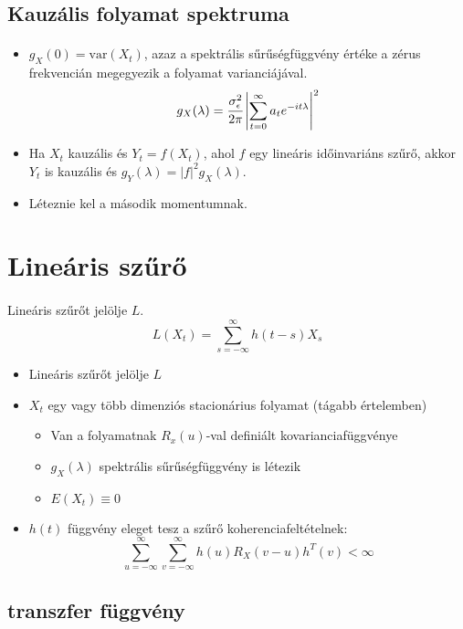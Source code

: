 \documentclass[11pt,a4paper]{article}
\begin{document}
				\subsection{Kauzális folyamat spektruma}
					\paragraph{}
					\begin{itemize}
						\item $g_X(0) = \text{var}(X_t)$, azaz a spektrális sűrűségfüggvény értéke a zérus frekvencián megegyezik a folyamat varianciájával. $$g_X(\lambda) = \cfrac{\sigma_\epsilon^2}{2 \pi} \left| \sum_{t=0}^\infty a_t e^{-it\lambda}\right|^2$$
						\item Ha $X_t$ kauzális és $Y_t = f(X_t)$, ahol $f$ egy lineáris időinvariáns szűrő, akkor $Y_t$ is kauzális és $g_Y(\lambda) = |f|^2 g_X(\lambda)$.
						\item Léteznie kel a második momentumnak.
					\end{itemize}
			\section{Lineáris szűrő}
				\paragraph{}
					Lineáris szűrőt jelölje $L$.
					$$L(X_t) = \sum_{s = -\infty}^\infty h(t-s)X_s$$
					
					\begin{itemize}
					  \item Lineáris szűrőt jelölje $L$
					  \item $X_t$ egy vagy több dimenziós stacionárius folyamat (tágabb értelemben)
					  \begin{itemize}
						    \item Van a folyamatnak $R_x(u)$-val definiált kovarianciafüggvénye
						    \item $g_X(\lambda)$ spektrális sűrűségfüggvény is létezik
						    \item $E(X_t) \equiv 0$
					  \end{itemize}
					  \item $h(t)$ függvény eleget tesz a szűrő koherenciafeltételnek: 
					  $$\sum_{u = -\infty} ^\infty \sum_{v = -\infty}^\infty h(u) R_X(v-u) h^T(v) < \infty$$
					\end{itemize}


				\subsection{transzfer függvény}
\end{document}
